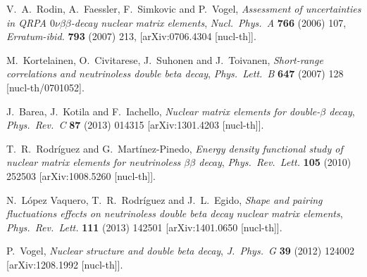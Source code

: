 \documentclass{PoS}
\begin{document}
\begin{thebibliography}{99}
   V.~A.~Rodin, A.~Faessler, F.~Simkovic and P.~Vogel,
   \emph{Assessment of uncertainties in QRPA $0\nu\beta\beta$-decay nuclear matrix elements},
   \emph{Nucl.\ Phys.\ A} {\bf 766} (2006) 107, 
   \emph{Erratum-ibid.} {\bf 793} (2007) 213,
   [arXiv:0706.4304 [nucl-th]].

   M.~Kortelainen, O.~Civitarese, J.~Suhonen and J.~Toivanen,
   \emph{Short-range correlations and neutrinoless double beta decay},
   \emph{Phys.\ Lett.\ B} {\bf 647} (2007) 128
   [nucl-th/0701052].

   J.~Barea, J.~Kotila and F.~Iachello,
   \emph{Nuclear matrix elements for double-$\beta$ decay},
   \emph{Phys.\ Rev.\ C} {\bf 87} (2013) 014315
   [arXiv:1301.4203 [nucl-th]].

   T.~R.~Rodr\'iguez and G.~Mart\'inez-Pinedo,
   \emph{Energy density functional study of nuclear matrix elements for neutrinoless $\beta\beta$ decay},
   \emph{Phys.\ Rev.\ Lett.} {\bf 105} (2010) 252503
   [arXiv:1008.5260 [nucl-th]].

   N.~L\'opez Vaquero, T.~R.~Rodr\'iguez and J.~L.~Egido,
   \emph{Shape and pairing fluctuations effects on neutrinoless double beta decay nuclear matrix elements},
   \emph{Phys.\ Rev.\ Lett.} {\bf 111} (2013) 142501
   [arXiv:1401.0650 [nucl-th]].

   P.~Vogel,
   \emph{Nuclear structure and double beta decay},
   \emph{J.\ Phys.\ G} {\bf 39} (2012) 124002
   [arXiv:1208.1992 [nucl-th]].

\end{thebibliography}
\end{document}
